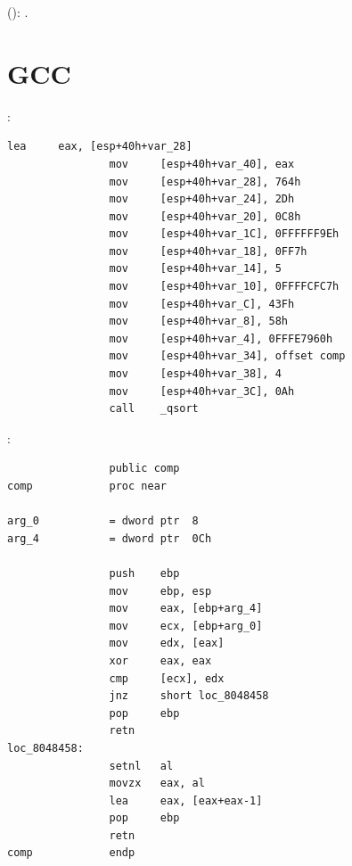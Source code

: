   \AndENRU 
{}  
(): 
 \comp {}.

\ifdefined\IncludeGCC
\section{GCC}

:

\begin{lstlisting}[caption=GCC]
                lea     eax, [esp+40h+var_28]
                mov     [esp+40h+var_40], eax
                mov     [esp+40h+var_28], 764h
                mov     [esp+40h+var_24], 2Dh
                mov     [esp+40h+var_20], 0C8h
                mov     [esp+40h+var_1C], 0FFFFFF9Eh
                mov     [esp+40h+var_18], 0FF7h
                mov     [esp+40h+var_14], 5
                mov     [esp+40h+var_10], 0FFFFCFC7h
                mov     [esp+40h+var_C], 43Fh
                mov     [esp+40h+var_8], 58h
                mov     [esp+40h+var_4], 0FFFE7960h
                mov     [esp+40h+var_34], offset comp
                mov     [esp+40h+var_38], 4
                mov     [esp+40h+var_3C], 0Ah
                call    _qsort
\end{lstlisting}

:

\begin{lstlisting}
                public comp
comp            proc near

arg_0           = dword ptr  8
arg_4           = dword ptr  0Ch

                push    ebp
                mov     ebp, esp
                mov     eax, [ebp+arg_4]
                mov     ecx, [ebp+arg_0]
                mov     edx, [eax]
                xor     eax, eax
                cmp     [ecx], edx
                jnz     short loc_8048458
                pop     ebp
                retn
loc_8048458:
                setnl   al
                movzx   eax, al
                lea     eax, [eax+eax-1]
                pop     ebp
                retn
comp            endp
\end{lstlisting}

